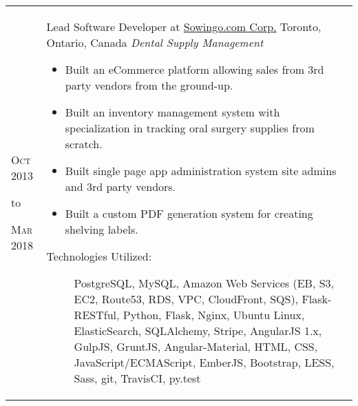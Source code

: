 \documentclass[a4paper,10pt]{article}
\begin{document}
        \\
        \begin{tabular}{ R{1.5cm} | p{10.5cm} }
            \hfill \textsc{Oct 2013}\newline
            \begin{center} to \end{center}
            \hfill \textsc{Mar 2018} &

            Lead Software Developer at \href{https://sowingo.com/}{Sowingo.com Corp.}\newline
            Toronto, Ontario, Canada\newline
            \emph{Dental Supply Management} \newline
            \fontsize{9pt}{10pt}\selectfont
            \begin{itemize}
                \item Built an eCommerce platform allowing sales from 3rd party vendors from the ground-up.
                \item Built an inventory management system with specialization in tracking oral surgery supplies from scratch.
                \item Built single page app administration system site admins and 3rd party vendors.
                \item Built a custom PDF generation system for creating shelving labels.
            \end{itemize}
            \bigskip
            \begin{description}
                \item[Technologies Utilized:]
                    PostgreSQL, MySQL, Amazon Web Services (EB, S3, EC2,
                    Route53, RDS, VPC, CloudFront, SQS), Flask-RESTful, Python,
                    Flask, Nginx, Ubuntu Linux, ElasticSearch, SQLAlchemy,
                    Stripe, AngularJS 1.x, GulpJS, GruntJS, Angular-Material,
                    HTML, CSS, JavaScript/ECMAScript, EmberJS, Bootstrap, LESS,
                    Sass, git, TravisCI, py.test
            \end{description}
        \end{tabular}
        \\
\end{document}
